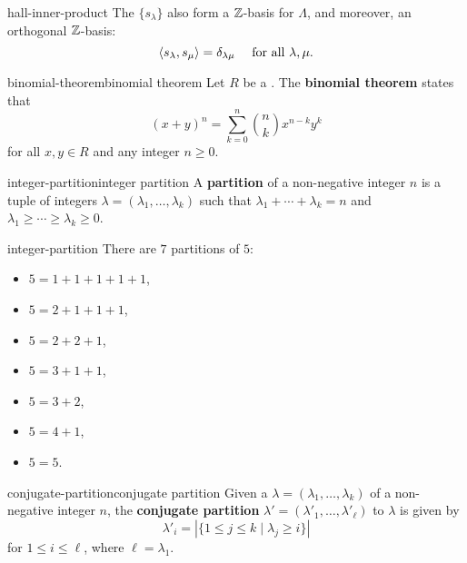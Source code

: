 \begin{example}{hall-inner-product}
    The  $\{ s_\lambda \}$ also form a $\mathbb{Z}$-basis for $\Lambda$, and moreover, an orthogonal $\mathbb{Z}$-basis:
    \[ \langle s_\lambda, s_\mu \rangle = \delta_{\lambda \mu} \quad \textup{ for all } \lambda, \mu . \]
\end{example}

\begin{topic}{binomial-theorem}{binomial theorem}
    Let $R$ be a . The \textbf{binomial theorem} states that
    \[ (x + y)^n = \sum_{k = 0}^{n} \binom{n}{k} x^{n - k} y^k \]
    for all $x, y \in R$ and any integer $n \ge 0$.
\end{topic}

\begin{topic}{integer-partition}{integer partition}
    A \textbf{partition} of a non-negative integer $n$ is a tuple of integers $\lambda = (\lambda_1, \ldots, \lambda_k)$ such that $\lambda_1 + \cdots + \lambda_k = n$ and $\lambda_1 \ge \cdots \ge \lambda_k \ge 0$.
\end{topic}

\begin{example}{integer-partition}
    There are $7$ partitions of $5$:
    \begin{itemize}
        \item $5 = 1 + 1 + 1 + 1 + 1$,
        \item $5 = 2 + 1 + 1 + 1$,
        \item $5 = 2 + 2 + 1$,
        \item $5 = 3 + 1 + 1$,
        \item $5 = 3 + 2$,
        \item $5 = 4 + 1$,
        \item $5 = 5$.
    \end{itemize}
\end{example}

\begin{topic}{conjugate-partition}{conjugate partition}
    Given a  $\lambda = (\lambda_1, \ldots, \lambda_k)$ of a non-negative integer $n$, the \textbf{conjugate partition} $\lambda' = (\lambda'_1, \ldots, \lambda'_\ell)$ to $\lambda$ is given by
    \[ \lambda'_i = | \{ 1 \le j \le k \mid \lambda_j \ge i \} | \]
    for $1 \le i \le \ell$, where $\ell = \lambda_1$.
\end{topic}

